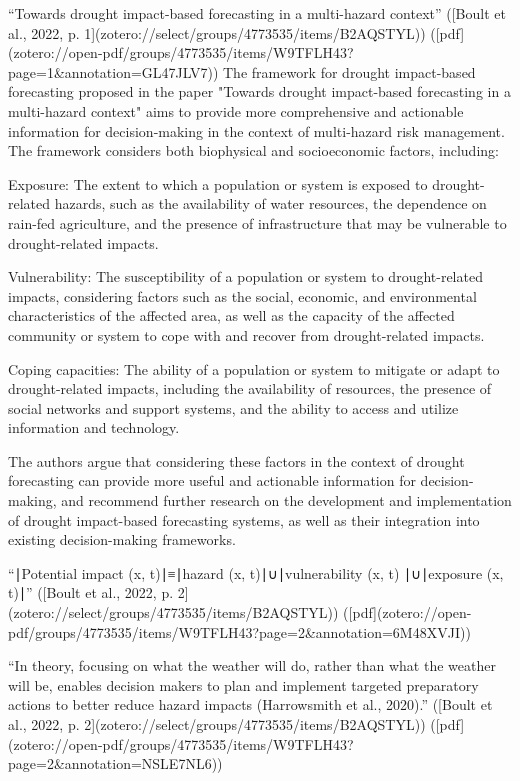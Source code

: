 {“Towards drought impact-based forecasting in a multi-hazard context” ([Boult et al., 2022, p. 1](zotero://select/groups/4773535/items/B2AQSTYL)) ([pdf](zotero://open-pdf/groups/4773535/items/W9TFLH43?page=1&annotation=GL47JLV7))
The framework for drought impact-based forecasting proposed in the paper "Towards drought impact-based forecasting in a multi-hazard context" aims to provide more comprehensive and actionable information for decision-making in the context of multi-hazard risk management. The framework considers both biophysical and socioeconomic factors, including:

Exposure: The extent to which a population or system is exposed to drought-related hazards, such as the availability of water resources, the dependence on rain-fed agriculture, and the presence of infrastructure that may be vulnerable to drought-related impacts.

Vulnerability: The susceptibility of a population or system to drought-related impacts, considering factors such as the social, economic, and environmental characteristics of the affected area, as well as the capacity of the affected community or system to cope with and recover from drought-related impacts.

Coping capacities: The ability of a population or system to mitigate or adapt to drought-related impacts, including the availability of resources, the presence of social networks and support systems, and the ability to access and utilize information and technology.

The authors argue that considering these factors in the context of drought forecasting can provide more useful and actionable information for decision-making, and recommend further research on the development and implementation of drought impact-based forecasting systems, as well as their integration into existing decision-making frameworks.


“∣Potential impact (x, t)∣≡∣hazard (x, t)∣∪∣vulnerability (x, t) ∣∪∣exposure (x, t)∣” ([Boult et al., 2022, p. 2](zotero://select/groups/4773535/items/B2AQSTYL)) ([pdf](zotero://open-pdf/groups/4773535/items/W9TFLH43?page=2&annotation=6M48XVJI))

“In theory, focusing on what the weather will do, rather than what the weather will be, enables decision makers to plan and implement targeted preparatory actions to better reduce hazard impacts (Harrowsmith et al., 2020).” ([Boult et al., 2022, p. 2](zotero://select/groups/4773535/items/B2AQSTYL)) ([pdf](zotero://open-pdf/groups/4773535/items/W9TFLH43?page=2&annotation=NSLE7NL6))

}

